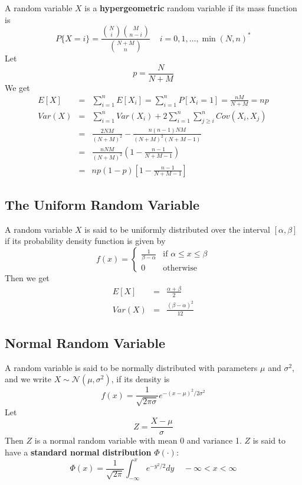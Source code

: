 \documentclass[12pt]{article}
\begin{document}
A random variable $X$ is a \textbf{hypergeometric} random variable if its mass function is
\begin{equation*}
  P\{ X = i \} = \frac
  {\binom{N}{i} \binom{M}{n-i}}
  {\binom{N+M}{n}} \;\;\;\; i = 0,1,\dots,\min(N,n)^*
\end{equation*}
Let
\begin{equation*}
  p = \frac {N}{N+M}
\end{equation*}
We get
\begin{eqnarray*}
  E[X] &=& \sum_{i=1}^n E[X_i] = \sum_{i=1}^n P[X_i=1] = \frac{nM}{N+M} = np \\
  Var(X) &=& \sum_{i=1}^n Var(X_i) + 
  2 \sum_{i=1}^n \sum_{j \ge i}^n Cov(X_i, X_j) \\
  &=& \frac{2NM}{(N+M)^2} - \frac{n(n-1)NM}{(N+M)^2(N+M-1)} \\
  &=& \frac{nNM}{(N+M)^2} \left( 1 - \frac{n-1}{N+M-1} \right) \\
  &=& np(1-p) \left[ 1 - \frac{n-1}{N+M-1} \right]
\end{eqnarray*}

\subsection{The Uniform Random Variable}

A random variable $X$ is said to be uniformly distributed over the interval $[\alpha, \beta]$ if its probability density function is given by
\begin{equation*}
  f(x) = 
  \begin{cases}
    \frac{1}{\beta - \alpha} & \text{if } \alpha \le x \le \beta \\
    0 & \text{otherwise}
  \end{cases}
\end{equation*}
Then we get
\begin{eqnarray*}
  E[X] &=& \frac{\alpha + \beta}{2} \\
  Var(X) &=& \frac{(\beta - \alpha)^2}{12}
\end{eqnarray*}

\subsection{Normal Random Variable}

A random variable is said to be normally distributed with parameters $\mu$ and $\sigma^2$, and we write $X \sim \mathcal{N}(\mu, \sigma^2)$, if its density is
\begin{equation*}
  f(x) = \frac{1}{\sqrt{2 \pi \sigma}} e^{-(x-\mu)^2/2\sigma^2}
\end{equation*}
Let
\begin{equation*}
  Z = \frac{X-\mu}{\sigma}
\end{equation*}
Then $Z$ is a normal random variable with mean 0 and variance 1. $Z$ is said to have a \textbf{standard normal distribution} $\Phi(\cdot)$:
\begin{equation*}
  \Phi(x) = \frac{1}{\sqrt{2 \pi}} \int_{-\infty}^x e^{-y^2/2} dy
  \;\;\;\; -\infty < x < \infty
\end{equation*}
\end{document}
